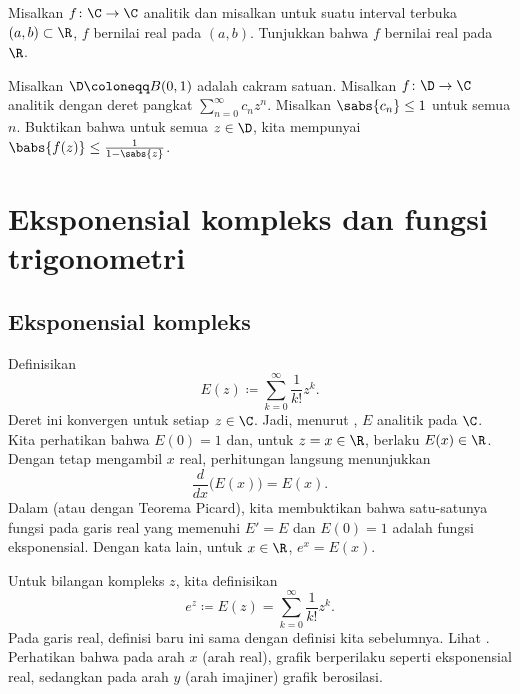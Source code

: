 \begin{exercise}
Misalkan $f \colon \C \to \C$ analitik dan misalkan untuk suatu
interval terbuka $(a,b) \subset \R$, $f$ bernilai real pada $(a,b)$.  Tunjukkan
bahwa $f$ bernilai real pada $\R$.
\end{exercise}

\begin{exercise}
Misalkan $\D \coloneqq B(0,1)$ adalah cakram satuan.  Misalkan
$f \colon \D \to \C$ analitik dengan deret pangkat
$\sum_{n=0}^\infty c_n z^n$.  Misalkan $\sabs{c_n} \leq 1$ untuk semua $n$.  Buktikan bahwa untuk
semua $z \in \D$, kita mempunyai
$\babs{f(z)} \leq \frac{1}{1-\sabs{z}}$.
\end{exercise}


\sectionnewpage
\section{Eksponensial kompleks dan fungsi trigonometri}
\label{sec:complexexp}



\subsection{Eksponensial kompleks}

Definisikan
\begin{equation*}
E(z) \coloneqq \sum_{k=0}^\infty \frac{1}{k!} z^k .
\end{equation*}
Deret ini konvergen untuk setiap $z \in \C$.
Jadi, menurut
, $E$ analitik pada $\C$. Kita perhatikan bahwa $E(0) = 1$
dan, untuk $z=x \in \R$, berlaku $E(x) \in \R$. Dengan tetap mengambil $x$ real,
perhitungan langsung menunjukkan
\begin{equation*}
\frac{d}{dx} \bigl( E(x) \bigr) = E(x) .
\end{equation*}
Dalam  (atau dengan Teorema Picard), kita membuktikan bahwa
satu-satunya fungsi pada garis real yang memenuhi $E' = E$ dan
$E(0) = 1$ adalah fungsi eksponensial. Dengan kata lain, untuk $x \in \R$, $e^x = E(x)$.

Untuk bilangan kompleks $z$, kita definisikan
\begin{equation*}
e^z \coloneqq E(z) = 
\sum_{k=0}^\infty \frac{1}{k!} z^k .
\end{equation*}
Pada garis real, definisi baru ini sama dengan definisi kita sebelumnya.
Lihat . Perhatikan bahwa pada arah $x$
(arah real),
grafik berperilaku seperti eksponensial real, sedangkan pada arah $y$
(arah imajiner) grafik berosilasi.

